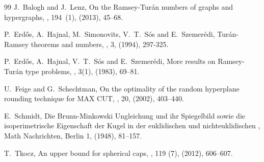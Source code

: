 \begin{thebibliography}{99}
J.~Balogh and J.~Lenz,
\newblock On the {R}amsey-{T}ur\'an numbers of graphs and hypergraphs,
, 194~(1), (2013), 45--68.

P.~Erd\H os, A.~Hajnal, M.~Simonovits, V.~T.~S\'os and E.~Szemer\'edi,
\newblock Tur\'an-Ramsey theorems and  numbers,
, 3, (1994), 297-325.

P.~Erd\H os, A.~Hajnal, V.~T.~S\'os and E.~Szemer\'edi,
\newblock More results on Ramsey-Tur\'an type problems,
, 3(1), (1983), 69--81.

U.~Feige and G.~Schechtman,
\newblock On the optimality of the random hyperplane rounding technique for MAX CUT,
, 20, (2002), 403--440.

E.~Schmidt, 
\newblock Die Brunn-Minkowski Ungleichung und ihr Spiegelbild sowie die isoperimetrische Eigenschaft der Kugel in der euklidischen und nichteuklidischen
, Math Nachrichten, Berlin 1, (1948), 81--157.

T.~Tkocz,
\newblock An upper bound for spherical caps,
, 119 (7), (2012), 606--607.

\end{thebibliography}
